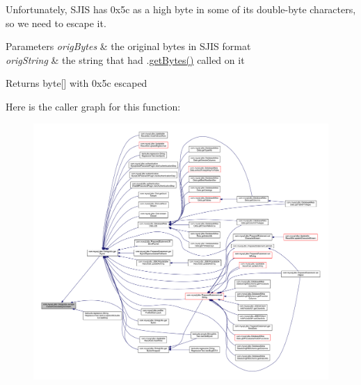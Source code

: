 Unfortunately, S\+J\+IS has 0x5c as a high byte in some of its double-\/byte characters, so we need to escape it.


\begin{DoxyParams}{Parameters}
{\em orig\+Bytes} & the original bytes in S\+J\+IS format \\
\hline
{\em orig\+String} & the string that had .\mbox{\hyperlink{classcom_1_1mysql_1_1jdbc_1_1_string_utils_ab237c5e450dc15a76201b3f13d44e6b3}{get\+Bytes()}} called on it\\
\hline
\end{DoxyParams}
\begin{DoxyReturn}{Returns}
byte\mbox{[}\mbox{]} with 0x5c escaped 
\end{DoxyReturn}
Here is the caller graph for this function\+:
\nopagebreak
\begin{figure}[H]
\begin{center}
\leavevmode
\includegraphics[width=350pt]{classcom_1_1mysql_1_1jdbc_1_1_string_utils_a7d62af1e510047299adcf569e5d94c84_icgraph}
\end{center}
\end{figure}
\mbox{\label{classcom_1_1mysql_1_1jdbc_1_1_string_utils_a118670d9eee02bcc84a54737721389dd}} 
